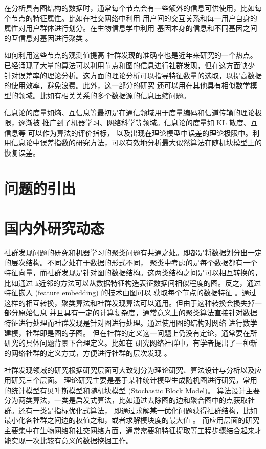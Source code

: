 在分析具有图结构的数据时，通常每个节点会有一些额外的信息可供使用，比如每个节点的特征属性。比如在社交网络中利用
用户间的交互关系和每一用户自身的属性对用户群体进行划分。在生物信息学中利用
基因本身的信息和不同基因之间的互信息对基因进行聚类 \cite{4359897}。

如何利用这些节点的观测值提高
社群发现的准确率也是近年来研究的一个热点。已经涌现了大量的算法可以利用节点和图的信息进行社群发现，但在这方面缺少
针对误差率的理论分析。这方面的理论分析可以指导特征数量的选取，以提高数据的使用效率，避免浪费。此外，这一部分的研究
还可以用在其他具有相似数学模型的领域。比如有相关关系的多个数据源的信息压缩问题。

信息论的度量如熵、互信息等最初是在通信领域用于度量编码和信道传输的理论极限，逐渐被
推广到了机器学习、网络科学等领域。信息论的度量如 KL 散度、互信息等 可以作为算法的评价指标，
以及出现在理论模型中误差的理论极限中。利用信息论中误差指数的研究方法，可以有效地分析最大似然算法在随机块模型上的
恢复误差。

\section{问题的引出}

\section{国内外研究动态}
社群发现问题的研究和机器学习的聚类问题有共通之处。即都是将数据划分出一定的层次结构。不同之处在于数据的形式不同，
聚类中考虑的是每个数据都有一个特征向量，而社群发现是针对图的数据结构。这两类结构之间是可以相互转换的，比如通过
k近邻的方法可以从数据特征构造表征数据间相似程度的图。反之，通过特征嵌入 (feature embedding) 的技术由图可以
获取每个节点的数据特征 \cite{hamilton2017representation}。通过这样的相互转换，聚类算法和社群发现算法可以通用。但由于这种转换会损失掉一部分原始信息
并且具有一定的计算复杂度，通常意义上的聚类算法直接针对数据特征进行处理而社群发现是针对图进行处理。通过使用图的结构对网络
进行数学建模，社群即是图的子图。
但在社群的定义这一问题上仍没有定论，通常要在所研究的具体问题背景下合理定义。比如在
研究网络社群中，有学者提出了一种新的网络社群的定义方式，方便进行社群的层次发现
\cite{alphabetaclustering2019}。

社群发现领域的研究根据研究层面可大致划分为理论研究、算法设计与分析以及应用研究三个层面。
理论研究主要是基于某种统计模型生成随机图进行研究，常用的统计模型有贝叶斯模型和随机块模型 (Stochastic Block Model)。
算法设计主要分为两类算法，一类是启发式算法，比如通过去除图的边和聚合图中的点获取社群。还有一类是指标优化式算法，
即通过求解某一优化问题获得社群结构，比如最小化各社群之间边的权值之和，或者求解模块度的最大值 \cite{newman2006modularity}。
而应用层面的研究主要集中在生物网络和社交网络方面，通常需要和特征提取等工程步骤结合起来才能实现一次比较有意义的数据挖掘工作。

